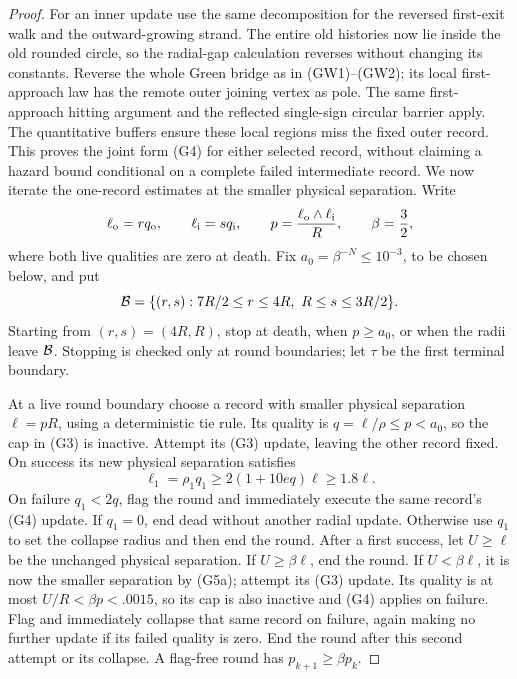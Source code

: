 \begin{proof}
For an inner update use the same decomposition for the reversed first-exit
walk and the outward-growing strand.  The entire old histories now lie
inside the old rounded circle, so the radial-gap calculation reverses
without changing its constants.  Reverse the whole Green bridge as in
(GW1)--(GW2); its local first-approach law has the remote outer joining vertex
as pole.  The same first-approach hitting argument and the reflected
single-sign circular barrier apply.  The quantitative buffers ensure
these local regions miss the fixed outer record.  This proves the joint
form (G4) for either selected record, without claiming a hazard bound
conditional on a complete failed intermediate record.
We now iterate the one-record estimates at the smaller physical
separation.  Write
\[
 \ell_{\rm o}=r q_{\rm o},\qquad \ell_{\rm i}=s q_{\rm i},\qquad
 p={\ell_{\rm o}\wedge\ell_{\rm i}\over R},\qquad \beta={3\over2},
\]
where both live qualities are zero at death.  Fix
\(a_0=\beta^{-N}\le10^{-3}\), to be chosen below, and put
\[
 {\cal B}=\{(r,s):7R/2\le r\le4R,\ R\le s\le3R/2\}.
\]
Starting from \((r,s)=(4R,R)\), stop at death, when \(p\ge a_0\), or
when the radii leave \({\cal B}\).  Stopping is checked only at round
boundaries; let \(\tau\) be the first terminal boundary.

At a live round boundary choose a record with smaller physical separation
\(\ell=pR\), using a deterministic tie rule.  Its quality is
\(q=\ell/\rho\le p<a_0\), so the cap in (G3) is inactive.  Attempt its
(G3) update, leaving the other record fixed.  On success its new physical
separation satisfies
\[
 \ell_1=\rho_1q_1\ge2(1+10eq)\ell\ge1.8\ell.              \tag{G5a}
\]
On failure \(q_1<2q\), flag the round and immediately execute the same
record's (G4) update.  If \(q_1=0\), end dead without another radial
update.  Otherwise use \(q_1\) to set the collapse radius and then end
the round.  After a first success, let \(U\ge\ell\) be the unchanged
physical separation.  If \(U\ge\beta\ell\), end the round.  If
\(U<\beta\ell\), it is now the smaller separation by (G5a); attempt its
(G3) update.  Its quality is at most \(U/R<\beta p<.0015\), so its cap
is also inactive and (G4) applies on failure.  Flag and immediately
collapse that same record on failure, again making no further update if
its failed quality is zero.  End the round after this second attempt or
its collapse.  A flag-free round has \(p_{k+1}\ge\beta p_k\).


\end{proof}
